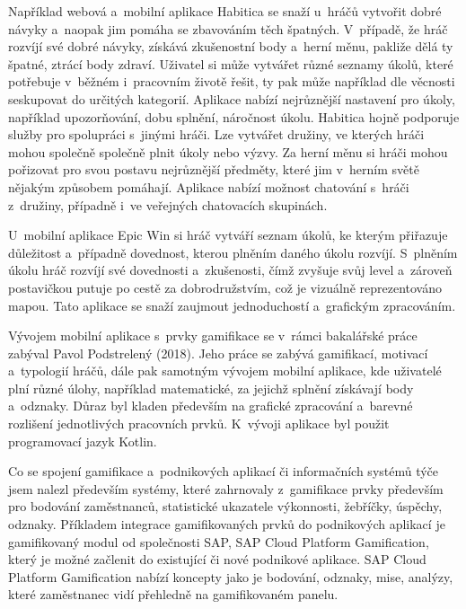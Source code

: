 \documentclass[12pt]{article}
\begin{document}
Například webová a~mobilní aplikace Habitica se snaží u~hráčů vytvořit dobré návyky
a~naopak jim pomáha se zbavováním těch špatných.
V~případě, že hráč rozvíjí své dobré návyky,
získává zkušenostní body a~herní měnu, 
pakliže dělá ty špatné, ztrácí body zdraví. 
Uživatel si může vytvářet různé seznamy úkolů,
které potřebuje v~běžném i~pracovním životě řešit,
ty pak může například dle věcnosti seskupovat do určitých kategorií.
Aplikace nabízí nejrůznější nastavení pro úkoly, například upozorňování, dobu splnění, náročnost úkolu.
Habitica hojně podporuje služby pro spolupráci s~jinými hráči. Lze vytvářet družiny,
ve kterých hráči mohou společně společně plnit úkoly nebo výzvy.
Za herní měnu si hráči mohou pořizovat pro svou postavu nejrůznější předměty, 
které jim v~herním světě nějakým způsobem pomáhají. 
Aplikace nabízí možnost chatování s~hráči z~družiny, případně i~ve veřejných chatovacích skupinách.  

\par

U~mobilní aplikace Epic Win si hráč vytváří seznam úkolů,
ke kterým přiřazuje důležitost a~případně dovednost,
kterou plněním daného úkolu rozvíjí. 
S~plněním úkolu hráč rozvíjí své dovednosti a~zkušenosti,
 čímž zvyšuje svůj level a~zároveň postavičkou putuje po cestě za dobrodružstvím, 
což je vizuálně reprezentováno mapou. 
Tato aplikace se snaží zaujmout jednoduchostí a~grafickým zpracováním.

\par

Vývojem mobilní aplikace s~prvky gamifikace se v~rámci bakalářské práce zabýval Pavol Podstrelený (2018). 
Jeho práce se zabývá gamifikací, motivací a~typologií hráčů, dále pak samotným vývojem mobilní aplikace, 
kde uživatelé plní různé úlohy, například matematické, za jejichž splnění získávají body a~odznaky.
Důraz byl kladen především na grafické zpracování a~barevné rozlišení jednotlivých pracovních prvků.
K~vývoji aplikace byl použit programovací jazyk Kotlin.

\par

Co se spojení gamifikace a~podnikových aplikací či informačních systémů týče jsem nalezl především systémy,
které zahrnovaly z~gamifikace prvky především pro bodování zaměstnanců, statistické ukazatele výkonnosti, žebříčky, úspěchy, odznaky.
Příkladem integrace gamifikovaných prvků do podnikových aplikací je gamifikovaný modul od společnosti SAP, SAP Cloud Platform Gamification,
který je možné začlenit do existující či nové podnikové aplikace. 
SAP Cloud Platform Gamification nabízí koncepty jako je bodování, odznaky, mise, analýzy, které zaměstnanec vidí přehledně na gamifikovaném panelu.
\end{document}

